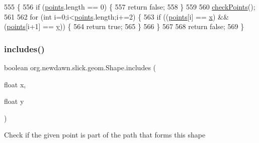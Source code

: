 \begin{DoxyCode}
555                                                \{        
556         \textcolor{keywordflow}{if} (\mbox{\hyperlink{classorg_1_1newdawn_1_1slick_1_1geom_1_1_shape_a8b4d4058734bbb3b96072e470b92aa37}{points}}.length == 0) \{
557             \textcolor{keywordflow}{return} \textcolor{keyword}{false};
558         \}
559         
560         \mbox{\hyperlink{classorg_1_1newdawn_1_1slick_1_1geom_1_1_shape_a84293802d05e8666a441720bfc12745d}{checkPoints}}();
561         
562         \textcolor{keywordflow}{for} (\textcolor{keywordtype}{int} i=0;i<\mbox{\hyperlink{classorg_1_1newdawn_1_1slick_1_1geom_1_1_shape_a8b4d4058734bbb3b96072e470b92aa37}{points}}.length;i+=2) \{
563             \textcolor{keywordflow}{if} ((\mbox{\hyperlink{classorg_1_1newdawn_1_1slick_1_1geom_1_1_shape_a8b4d4058734bbb3b96072e470b92aa37}{points}}[i] == \mbox{\hyperlink{classorg_1_1newdawn_1_1slick_1_1geom_1_1_shape_a3e985bfff386c15a4efaad03d8ad60d3}{x}}) && (\mbox{\hyperlink{classorg_1_1newdawn_1_1slick_1_1geom_1_1_shape_a8b4d4058734bbb3b96072e470b92aa37}{points}}[i+1] == \mbox{\hyperlink{classorg_1_1newdawn_1_1slick_1_1geom_1_1_shape_a9f934baded6a1b65ebb69e7e5f80ea00}{y}})) \{
564                 \textcolor{keywordflow}{return} \textcolor{keyword}{true};
565             \}
566         \}
567         
568         \textcolor{keywordflow}{return} \textcolor{keyword}{false};
569     \}
\end{DoxyCode}
\mbox{\label{classorg_1_1newdawn_1_1slick_1_1geom_1_1_shape_ac7e6d7cadb85051689c613c30985490d}} 
\subsubsection{\texorpdfstring{includes()}{includes()}}
{\footnotesize\ttfamily boolean org.\+newdawn.\+slick.\+geom.\+Shape.\+includes (\begin{DoxyParamCaption}\item[{float}]{x,  }\item[{float}]{y }\end{DoxyParamCaption})\hspace{0.3cm}{\ttfamily [inline]}}

Check if the given point is part of the path that forms this shape



